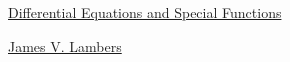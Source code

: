 \documentclass[11pt]{article}
\begin{document}
	\kaishu 
	\setcounter{section}{0}
	\begin{center}
		{\LARGE  \href{https://kss-methods.web.app/jvl/mat415/}{Differential Equations and Special Functions}}
		
		
		{\large \href{https://kss-methods.web.app/jvl/}{James V. Lambers}}
	\end{center}
\setcounter{page}{1}

\end{document}
